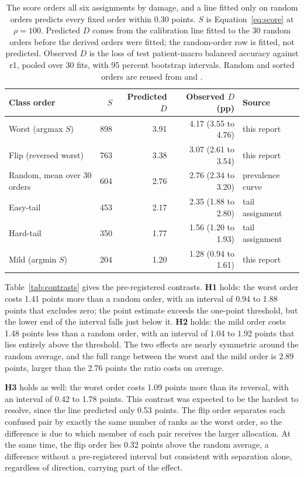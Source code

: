 \begin{table}[htbp]
\centering
\small
\setlength{\tabcolsep}{6pt}
\renewcommand{\arraystretch}{1.08}
\begin{tabular}{@{}lrrrl@{}}
\toprule
Class order & $S$ & Predicted $D$ & Observed $D$ (pp) & Source \\
\midrule
Worst (argmax $S$) & 898 & 3.91 & 4.17 \; (3.55 to 4.76) & this report \\
Flip (reversed worst) & 763 & 3.38 & 3.07 \; (2.61 to 3.54) & this report \\
Random, mean over 30 orders & 604 & 2.76 & 2.76 \; (2.34 to 3.20) & prevalence curve \\
Easy-tail & 453 & 2.17 & 2.35 \; (1.88 to 2.80) & tail assignment \\
Hard-tail & 350 & 1.77 & 1.56 \; (1.20 to 1.93) & tail assignment \\
Mild (argmin $S$) & 204 & 1.20 & 1.28 \; (0.94 to 1.61) & this report \\
\bottomrule
\end{tabular}
\caption{The score orders all six assignments by damage, and a line fitted only on random orders predicts every fixed order within 0.30 points. $S$ is Equation~\eqref{eq:score} at $\rho=100$. Predicted $D$ comes from the calibration line fitted to the 30 random orders before the derived orders were fitted; the random-order row is fitted, not predicted. Observed $D$ is the loss of test patient-macro balanced accuracy against r1, pooled over 30 fits, with 95 percent bootstrap intervals. Random and sorted orders are reused from \citet{queisler2026prevalenceTcga} and \citet{queisler2026tailTcga}.}
\label{tab:damage}
\end{table}

\noindent Table~\ref{tab:contrasts} gives the pre-registered contrasts. \textbf{H1} holds: the worst order costs 1.41 points more than a random order, with an interval of 0.94 to 1.88 points that excludes zero; the point estimate exceeds the one-point threshold, but the lower end of the interval falls just below it. \textbf{H2} holds: the mild order costs 1.48 points less than a random order, with an interval of 1.04 to 1.92 points that lies entirely above the threshold. The two effects are nearly symmetric around the random average, and the full range between the worst and the mild order is 2.89 points, larger than the 2.76 points the ratio costs on average.

\textbf{H3} holds as well: the worst order costs 1.09 points more than its reversal, with an interval of 0.42 to 1.78 points. This contrast was expected to be the hardest to resolve, since the line predicted only 0.53 points. The flip order separates each confused pair by exactly the same number of ranks as the worst order, so the difference is due to which member of each pair receives the larger allocation. At the same time, the flip order lies 0.32 points above the random average, a difference without a pre-registered interval but consistent with separation alone, regardless of direction, carrying part of the effect.

